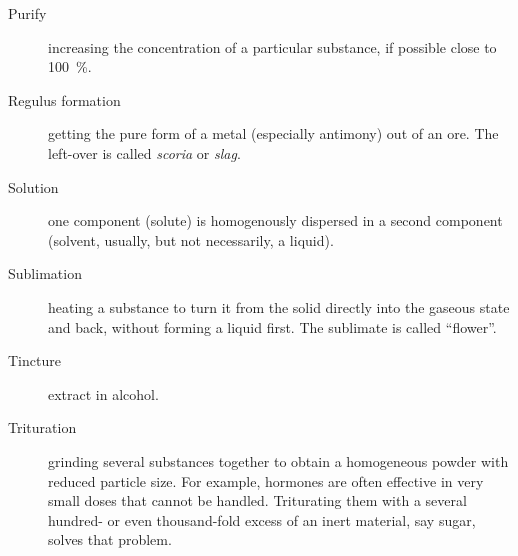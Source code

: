 \documentclass[british,final,landscape]{scrartcl}
\begin{document}
\begin{refsection}
\begin{description}
  \item[Purify]{increasing the concentration of a particular substance, if possible close to \SI{100}{\%}. }
  \item[Regulus formation]{getting the pure form of a metal (especially antimony) out of an ore. The left-over is called \emph{scoria} or \emph{slag}. }
  \item[Solution]{one component (solute) is homogenously dispersed in a second component (solvent, usually, but not necessarily, a liquid). }
  \item[Sublimation]{heating a substance to turn it from the solid directly into the gaseous state and back, without forming a liquid first. The sublimate is called ``flower''.}
  \item[Tincture]{extract in alcohol.}
  \item[Trituration]{grinding several substances together to obtain a homogeneous powder with reduced particle size. For example, hormones are often effective in very small doses that cannot be handled. Triturating them with a several hundred- or even thousand-fold excess of an inert material, say sugar, solves that problem.  }
\end{description}


\end{refsection}
\end{document}
